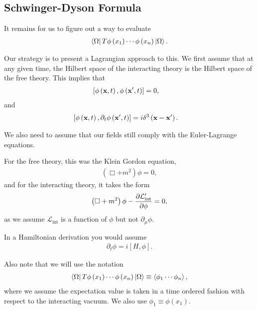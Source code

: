 
\subsection{Schwinger-Dyson Formula}

It remains for us to figure out a way to evaluate
\begin{align}
    \bra{\Omega} T \phi \left( x_1 \right) \cdots \phi \left( x_{n} \right) \ket{\Omega}
.\end{align}

Our strategy is to present a Lagrangian approach to this. We first assume that at any given time, the Hilbert space of the interacting theory is the Hilbert space of the free theory. This implies that
\begin{align}
    \left[ \phi \left( \vb{x},t \right) , \phi \left( \vb{x}', t \right)  \right] &= 0
,\end{align}
and
\begin{align}
    \left[ \phi \left( \vb{x},t \right) , \partial_t \phi \left( \vb{x}', t \right)  \right] &= i \delta^3 \left( \vb{x} -\vb{x}' \right) 
.\end{align}

We also need to assume that our fields still comply with the Euler-Lagrange equations.

For the free theory, this was the Klein Gordon equation,
\begin{align}
    \left( \Box + m^2 \right) \phi = 0
,\end{align}
and for the interacting theory, it takes the form
\begin{align}
    \left( \Box + m^2 \right) \phi - \pdv{\mathcal{L}_\text{int}'}{\phi} = 0
,\end{align}
as we assume $\mathcal{L}_{\text{int}}$ is a function of $\phi$ but not $\partial_\mu \phi$.

\begin{note}
    In a Hamiltonian derivation you would assume
    \begin{align}
        \partial_t \phi = i \left[ H, \phi \right] 
    .\end{align}

    Also note that we will use the notation
    \begin{align}
        \bra{\Omega} T \phi \left( x_1 \right) \cdots \phi \left( x_{n} \right) \ket{\Omega} \equiv \left<\phi_1 \cdots \phi_n \right>
    ,\end{align}
    where we assume the expectation value is taken in a time ordered fashion with respect to the interacting vacuum. We also use $\phi_1 \equiv \phi \left( x_1 \right) $.
\end{note}

